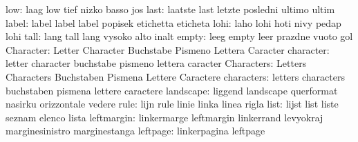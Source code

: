                      low: laag                      low
                           tief                      nizko
                           basso                     jos
                     last: laatste                   last
                           letzte                    posledni
                           ultimo                    ultim
                    label: label                     label
                           label                     popisek
                           etichetta                 eticheta
                     lohi: laho                      lohi
                           hoti                      nivy
                           pedap                     lohi %
                     tall: lang                      tall
                           lang                      vysoko
                           alto                      inalt %
                    empty: leeg                      empty
                           leer                      prazdne
                           vuoto                     gol
                Character: Letter                    Character
                           Buchstabe                 Pismeno
                           Lettera                   Caracter
                character: letter                    character
                           buchstabe                 pismeno
                           lettera                   caracter
               Characters: Letters                   Characters
                           Buchstaben                Pismena
                           Lettere                   Caractere
               characters: letters                   characters
                           buchstaben                pismena
                           lettere                   caractere
                landscape: liggend                   landscape
                           querformat                nasirku
                           orizzontale               vedere
                     rule: lijn                      rule
                           linie                     linka
                           linea                     rigla
                     list: lijst                     list
                           liste                     seznam
                           elenco                    lista
               leftmargin: linkermarge               leftmargin
                           linkerrand                levyokraj
                           marginesinistro           marginestanga
                 leftpage: linkerpagina              leftpage

